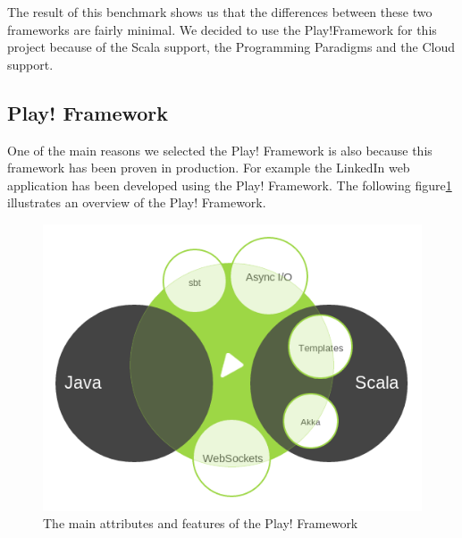 The result of this benchmark shows us that the differences between these two frameworks are fairly minimal. We decided to use the Play!Framework for this project because of the Scala support, the Programming Paradigms and the Cloud support.
\newpage

\subsection{Play! Framework}
  One of the main reasons we selected the Play! Framework is also because this framework has been proven in production. For example the LinkedIn web application has been developed using the Play! Framework. The following figure\ref{play} illustrates an overview of the Play! Framework.\\
\begin{figure}[h!]
\centering
\includegraphics[scale=0.5]{./img/play.png}
\caption{\small{The main attributes and features of the Play! Framework}}
\label{play}
\end{figure}
 
